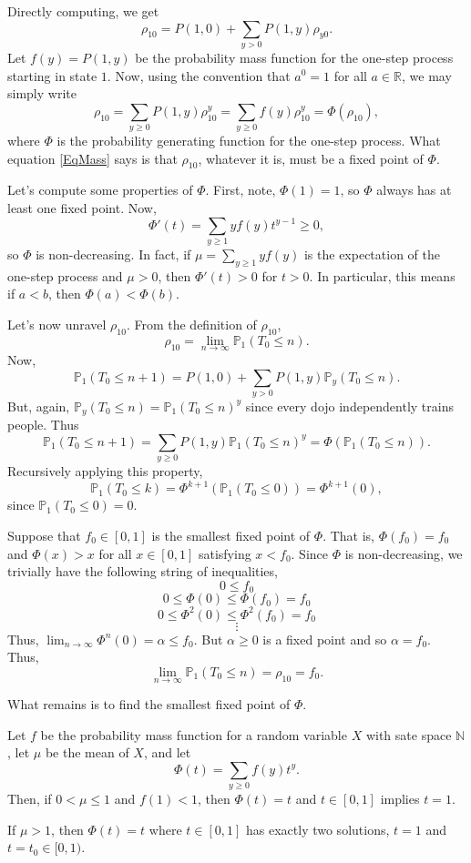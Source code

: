 \documentclass{problemset}
\newcommand{\R}{\mathbb{R}}
\newcommand{\N}{\mathbb{N}}
\renewcommand{\P}{\mathbb{P}}
\begin{document}
	Directly computing, we get
	\[
		\rho_{10} = P(1,0)+\sum_{y> 0}P(1,y)\rho_{y0}.
	\]
	Let $f(y) = P(1,y)$ be the probability mass function for the one-step process starting in state $1$.
	Now, using the convention that $a^0=1$ for all $a\in \R$, we may simply write
	\begin{equation}
		\label{EqMass}
		\rho_{10} = \sum_{y\geq 0} P(1,y)\rho_{10}^y = \sum_{y\geq 0} f(y)\rho_{10}^y=\Phi(\rho_{10}),
	\end{equation}
	where $\Phi$ is the probability generating function for the one-step process.  What equation \eqref{EqMass}
	says is that $\rho_{10}$, whatever it is, must be a fixed point of $\Phi$.

	Let's compute some properties of $\Phi$.  First, note, $\Phi(1)=1$, so $\Phi$ always has at least one
	fixed point.  Now,
	\[
		\Phi'(t) = \sum_{y\geq 1} yf(y) t^{y-1} \geq 0,
	\]
	so $\Phi$ is non-decreasing.  In fact, if $\mu=\sum_{y\geq 1} yf(y)$ is the expectation of the one-step
	process and $\mu > 0$, then $\Phi'(t) > 0$ for $t>0$.  In particular, this means if $a<b$, then $\Phi(a)<\Phi(b)$.

	Let's now unravel $\rho_{10}$.  From the definition of $\rho_{10}$,
	\[
		\rho_{10} = \lim_{n\to\infty} \P_1(T_0\leq n).
	\]
	Now,
	\[
		\P_1(T_0\leq n+1) = P(1,0) + \sum_{y > 0} P(1,y)\P_y(T_0 \leq n).
	\]
	But, again, $\P_y(T_0 \leq n) = \P_1(T_0\leq n)^y$ since every dojo independently trains people.  Thus
	\[
		\P_1(T_0\leq n+1) = \sum_{y \geq 0} P(1,y)\P_1(T_0 \leq n)^y=\Phi(\P_1(T_0\leq n)).
	\]
	Recursively applying this property,
	\[
		\P_1(T_0\leq k) = \Phi^{k+1}(\P_1(T_0\leq 0)) = \Phi^{k+1}(0),
	\]
	since $\P_1(T_0\leq 0)=0$.

	Suppose that $f_0\in[0,1]$ is the smallest fixed point of $\Phi$.  That is, $\Phi(f_0) = f_0$ and $\Phi(x) > x$ for all $x\in[0,1]$
	satisfying $x< f_0$.  Since $\Phi$ is non-decreasing, we trivially have the following string of inequalities,
	\[
		0  \leq f_0 
	\]\[
		0\leq \Phi(0)  \leq \Phi(f_0)=f_0 
	\]\[
		0\leq \Phi^2(0)  \leq \Phi^2(f_0)=f_0 
	\]\[
		\vdots
	\]
	Thus, $\lim_{n\to\infty} \Phi^n(0)=\alpha\leq f_0$.  But $\alpha\geq 0$ is a fixed point and so $\alpha=f_0$.  Thus,
	\[
		\lim_{n\to\infty} \P_1(T_0 \leq n) = \rho_{10} = f_0.
	\]

	What remains is to find the smallest fixed point of $\Phi$.

	\begin{theorem}
		Let $f$ be the probability mass function for a random variable $X$ with sate space $\N$, let $\mu$ be the
		mean of $X$, and let
		\[
			\Phi(t)= \sum_{y\geq 0} f(y) t^y.
		\]
		Then, if $0<\mu \leq 1$ and $f(1)<1$, then $\Phi(t)=t$ and $t\in[0,1]$ implies $t=1$.

		If $\mu > 1$, then $\Phi(t)=t$ where $t\in[0,1]$ has exactly two solutions, $t=1$ and
		$t=t_0\in[0,1)$.
	\end{theorem}
\end{document}

